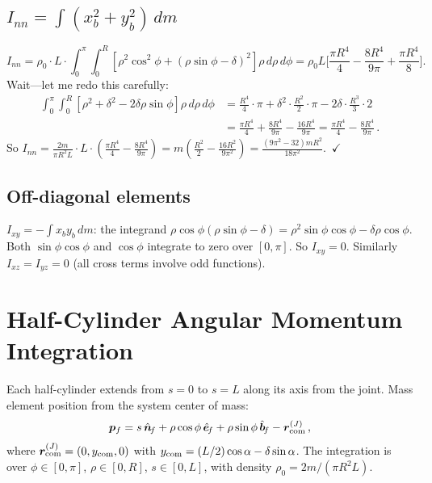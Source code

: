 \documentclass[11pt]{article}
\newcommand{\vect}[1]{\bm{#1}}
\newcommand{\uv}[1]{\hat{\bm{#1}}}
\newcommand{\nf}{\uv{n}_{\!f}}
\newcommand{\bfh}{\uv{b}_{\!f}}
\newcommand{\efh}{\uv{e}_{\!f}}
\begin{document}
\subsection{$I_{nn}=\int(x_b^2+y_b^2)\,dm$}

\begin{equation}
I_{nn} = \rho_0\cdot L\cdot\int_0^\pi\!\int_0^R
  [\rho^2\cos^2\!\phi+(\rho\sin\phi-\delta)^2]\rho\,d\rho\,d\phi
= \rho_0 L\biggl[\frac{\pi R^4}{4}-\frac{8R^4}{9\pi}+\frac{\pi R^4}{8}\biggr].
\end{equation}
Wait---let me redo this carefully:
\begin{align}
\int_0^\pi\!\int_0^R[\rho^2+\delta^2-2\delta\rho\sin\phi]\rho\,d\rho\,d\phi
&= \frac{R^4}{4}\cdot\pi+\delta^2\cdot\frac{R^2}{2}\cdot\pi
  -2\delta\cdot\frac{R^3}{3}\cdot 2 \\
&= \frac{\pi R^4}{4}+\frac{8R^4}{9\pi}-\frac{16R^4}{9\pi}
= \frac{\pi R^4}{4}-\frac{8R^4}{9\pi}\,.
\end{align}
So $I_{nn}=\frac{2m}{\pi R^2 L}\cdot L\cdot(\frac{\pi R^4}{4}
-\frac{8R^4}{9\pi})=m(\frac{R^2}{2}-\frac{16R^2}{9\pi^2})
=\frac{(9\pi^2-32)mR^2}{18\pi^2}$.~$\checkmark$

\subsection{Off-diagonal elements}

$I_{xy}=-\int x_b y_b\,dm$: the integrand $\rho\cos\phi(\rho\sin\phi-\delta)
=\rho^2\sin\phi\cos\phi-\delta\rho\cos\phi$.  Both $\sin\phi\cos\phi$ and
$\cos\phi$ integrate to zero over $[0,\pi]$.  So $I_{xy}=0$.  Similarly
$I_{xz}=I_{yz}=0$ (all cross terms involve odd functions).

\section{Half-Cylinder Angular Momentum Integration}
\label{app:half}

Each half-cylinder extends from $s=0$ to $s=L$ along its axis from the
joint.  Mass element position from the system center of mass:
\begin{equation}
\vect{p}_f = s\,\nf+\rho\cos\phi\,\efh+\rho\sin\phi\,\bfh
-\vect{r}_{\rm com}^{(J)}\,,
\end{equation}
where $\vect{r}_{\rm com}^{(J)}=(0,y_{\rm com},0)$ with
$y_{\rm com}=(L/2)\cos\alpha-\delta\sin\alpha$.  The integration is
over $\phi\in[0,\pi]$, $\rho\in[0,R]$, $s\in[0,L]$, with density
$\rho_0=2m/(\pi R^2 L)$.
\end{document}
